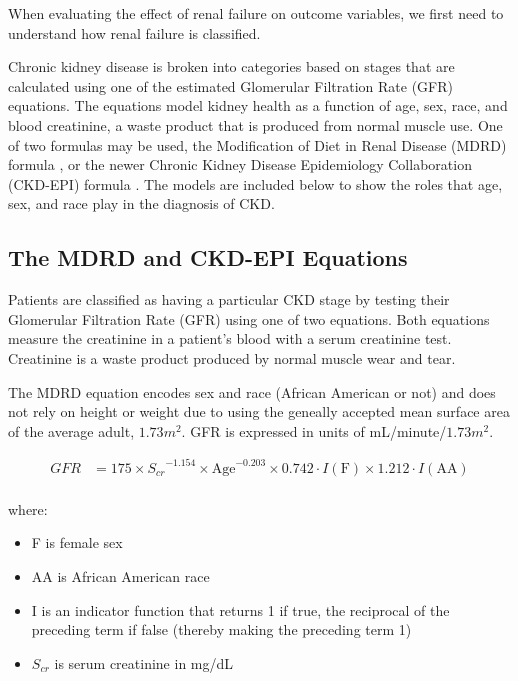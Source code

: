 \documentclass[12pt]{ociamthesis}\usepackage[]{graphicx}\usepackage[]{color}
\begin{document}
When evaluating the effect of renal failure on outcome variables, we first need to understand how renal failure is classified.

Chronic kidney disease is broken into categories based on stages that are calculated using one of the estimated Glomerular Filtration Rate
(GFR) equations. The equations model kidney health as a function of age, sex, race, and blood creatinine, a waste product that is produced from
normal muscle use. One of two formulas may be used, the Modification of Diet in Renal Disease (MDRD) formula \cite{Levey1999}, or the newer
Chronic Kidney Disease Epidemiology Collaboration (CKD-EPI) formula \cite{eGFR2018}. The models are included below to show the roles that
age, sex, and race play in the diagnosis of CKD.

\subsection{The MDRD and CKD-EPI Equations}

Patients are classified as having a particular CKD stage by testing their Glomerular Filtration Rate (GFR) using one of two equations.
Both equations measure the creatinine in a patient's blood with a serum creatinine test. Creatinine is a waste product produced by normal
muscle wear and tear. 

The MDRD equation encodes sex and race (African American or not) and does not rely on height or weight due to using the geneally accepted
mean surface area of the average adult, $1.73m^2$. GFR is expressed in units of mL/minute/$1.73m^2$.

\begin{equation} \label{mdrd}
\begin{split}
  GFR  &= 175 \times {S_{cr}}^{- 1.154} \times \text{Age}^{-0.203} \times 0.742 \cdot I(\text{F}) \times 1.212 \cdot I(\text{AA}) \\
\end{split}
\end{equation}

where:
\begin{itemize}
  \item F is female sex
  \item AA is African American race
  \item I is an indicator function that returns 1 if true, the reciprocal of the preceding term if false (thereby making the preceding term 1)
  \item $S_{cr}$ is serum creatinine in mg/dL
\end{itemize} 
\end{document}
